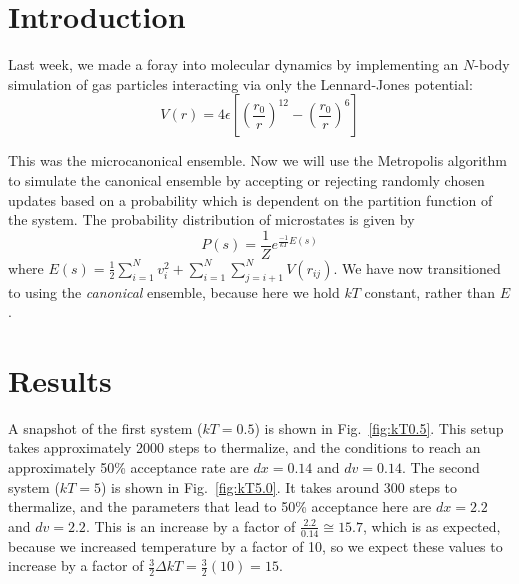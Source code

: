 \documentclass{article}
\author{\hwauthor}
\title{\hwtitle}
\date{April 21, 2021}
\begin{document}
\maketitle
\thispagestyle{fancy}

\section{Introduction}

Last week, we made a foray into molecular dynamics by implementing an $N$-body simulation of gas particles interacting via only the Lennard-Jones potential: \begin{equation}
   V(r)=4\epsilon\left[\left(\frac{r_0}{r}\right)^{12} - \left(\frac{r_0}{r}\right)^6\right]
\end{equation}

This was the microcanonical ensemble. Now we will use the Metropolis algorithm to simulate the canonical ensemble by accepting or rejecting randomly chosen updates based on a probability which is dependent on the partition function of the system. The probability distribution of microstates is given by \begin{equation}
   P(s)=\frac{1}{Z}e^{\frac{-1}{kT}E(s)}
\end{equation}
where $\displaystyle E(s)=\frac{1}{2}\sum_{i=1}^{N} v_{i}^2 + \sum_{i=1}^{N} \sum_{j=i+1}^{N} V(r_{ij})$. We have now transitioned to using the \emph{canonical} ensemble, because here we hold $kT$ constant, rather than $E$.

\section{Results}

\bigskip
{}
\medskip

A snapshot of the first system ($kT=0.5$) is shown in Fig.~\ref{fig:kT0.5}. This setup takes approximately 2000 steps to thermalize, and the conditions to reach an approximately 50\% acceptance rate are $dx=0.14$ and $dv=0.14$. The second system ($kT=5$) is shown in Fig.~\ref{fig:kT5.0}. It takes around 300 steps to thermalize, and the parameters that lead to 50\% acceptance here are $dx=2.2$ and $dv=2.2$. This is an increase by a factor of $\frac{2.2}{0.14}\cong15.7$, which is as expected, because we increased temperature by a factor of 10, so we expect these values to increase by a factor of $\frac{3}{2}\Delta kT=\frac{3}{2}(10)=15$.
\end{document}
